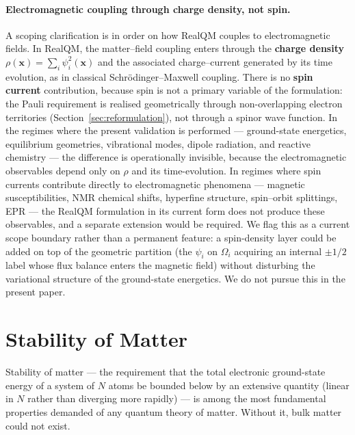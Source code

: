 \documentclass[11pt]{article}
\begin{document}
\paragraph{Electromagnetic coupling through charge density, not spin.}
A scoping clarification is in order on how RealQM couples to electromagnetic fields. In RealQM, the matter--field coupling enters through the \textbf{charge density} $\rho(\mathbf{x}) = \sum_i \psi_i^2(\mathbf{x})$ and the associated charge--current generated by its time evolution, as in classical Schr\"odinger--Maxwell coupling. There is no \textbf{spin current} contribution, because spin is not a primary variable of the formulation: the Pauli requirement is realised geometrically through non-overlapping electron territories (Section~\ref{sec:reformulation}), not through a spinor wave function. In the regimes where the present validation is performed --- ground-state energetics, equilibrium geometries, vibrational modes, dipole radiation, and reactive chemistry --- the difference is operationally invisible, because the electromagnetic observables depend only on $\rho$ and its time-evolution. In regimes where spin currents contribute directly to electromagnetic phenomena --- magnetic susceptibilities, NMR chemical shifts, hyperfine structure, spin--orbit splittings, EPR --- the RealQM formulation in its current form does not produce these observables, and a separate extension would be required. We flag this as a current scope boundary rather than a permanent feature: a spin-density layer could be added on top of the geometric partition (the $\psi_i$ on $\Omega_i$ acquiring an internal $\pm 1/2$ label whose flux balance enters the magnetic field) without disturbing the variational structure of the ground-state energetics. We do not pursue this in the present paper.

\section{Stability of Matter}\label{sec:som}

Stability of matter --- the requirement that the total electronic ground-state energy of a system of $N$ atoms be bounded below by an extensive quantity (linear in $N$ rather than diverging more rapidly) --- is among the most fundamental properties demanded of any quantum theory of matter. Without it, bulk matter could not exist.
\end{document}
